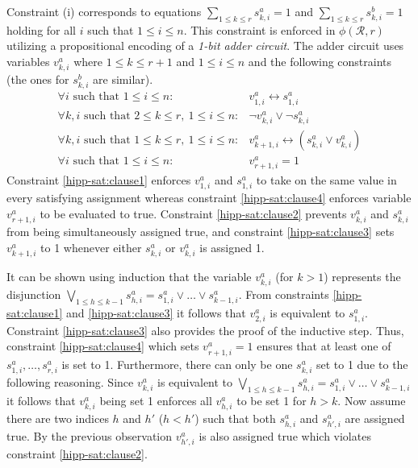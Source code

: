 \documentclass[12pt,a4paper]{article}
\begin{document}
Constraint (i) corresponds to equations $\sum_{1\leq k\leq r} s^a_{k,i} = 1$ and $\sum_{1\leq k\leq r} s^b_{k,i} = 1$ holding for all $i$ such that $1\leq i \leq n$.
This constraint is enforced in $\phi (\mathcal{R}, r)$ utilizing a propositional encoding of a \emph{1-bit adder circuit}.
The adder circuit uses variables $v^a_{k,i}$ where $1\leq k \leq r+1$ and $1\leq i\leq n$ and the following constraints (the ones for $s^b_{k,i}$ are similar).
\begin{eqnarray}
\forall i\text{ such that } 1\leq i\leq n: & v^a_{1,i} \leftrightarrow s^a_{1,i}\label{hipp-sat:clause1}\\
\forall k, i\text{ such that } 2\leq k \leq r,\ 1\leq i\leq n: & \neg v^a_{k,i} \vee \neg s^a_{k,i}\label{hipp-sat:clause2}\\
\forall k, i\text{ such that } 1\leq k \leq r,\ 1\leq i\leq n: & v^a_{k+1,i} \leftrightarrow (s^a_{k,i}\vee v^a_{k,i} )\label{hipp-sat:clause3}\\
\forall i\text{ such that } 1\leq i\leq n: & v^a_{r+1,i}=1\label{hipp-sat:clause4}
\end{eqnarray}
Constraint \eqref{hipp-sat:clause1} enforces $v^a_{1,i}$ and $s^a_{1,i}$ to take on the same value in every satisfying assignment whereas constraint \eqref{hipp-sat:clause4} enforces variable $v^a_{r+1,i}$ to be evaluated to true.
Constraint \eqref{hipp-sat:clause2} prevents $v^a_{k,i}$ and $s^a_{k,i}$ from being simultaneously assigned true, 
and constraint \eqref{hipp-sat:clause3} sets $v^a_{k+1,i}$ to 1 whenever either $s^a_{k,i}$ or $v^a_{k,i}$ is assigned 1.

It can be shown using induction that the variable $v^a_{k,i}$ (for $k>1$) represents the disjunction $\bigvee_{1\leq h\leq k-1}s^a_{h,i} = s^a_{1,i}\vee\dots \vee s^a_{k-1,i}$.
From constraints \eqref{hipp-sat:clause1} and \eqref{hipp-sat:clause3} it follows that $v^a_{2,i}$ is equivalent to $s^a_{1,i}$.
Constraint \eqref{hipp-sat:clause3} also provides the proof of the inductive step.
Thus, constraint \eqref{hipp-sat:clause4} which sets $v^a_{r+1,i}=1$ ensures that at least one of $s^a_{1,i},\dots , s^a_{r,i}$ is set to 1.
Furthermore, there can only be one $s^a_{k,i}$ set to 1 due to the following reasoning.
Since $v^a_{k,i}$ is equivalent to $\bigvee_{1\leq h\leq k-1}s^a_{h,i} = s^a_{1,i}\vee\dots \vee s^a_{k-1,i}$ it follows that $v^a_{k,i}$ being set 1 enforces all $v^a_{h,i}$ to be set 1 for $h>k$.
Now assume there are two indices $h$ and $h'$ ($h<h'$) such that both $s^a_{h,i}$ and $s^a_{h',i}$ are assigned true.
By the previous observation $v^a_{h',i}$ is also assigned true which violates constraint \eqref{hipp-sat:clause2}.
\end{document}
